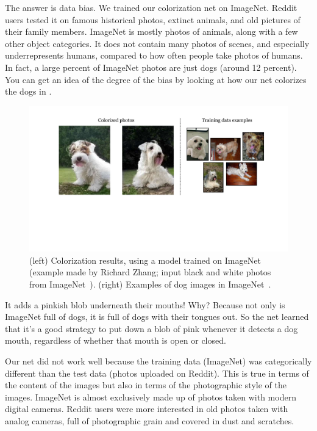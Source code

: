 The answer is data bias. We trained our colorization net on ImageNet. Reddit users tested it on famous historical photos, extinct animals, and old pictures of their family members. ImageNet is mostly photos of animals, along with a few other object categories. It does not contain many photos of scenes, and especially underrepresents humans, compared to how often people take photos of humans. In fact, a large percent of ImageNet photos are just dogs (around 12 percent). You can get an idea of the degree of the bias by looking at how our net colorizes the dogs in \fig{\ref{fig:bias_and_shift:dogs_with_tongues}}.
\begin{figure}[h!]
    \centerline{
    \includegraphics[width=0.9\linewidth]{./figures/bias_and_shift/dogs_with_tongues.pdf}
    }
    \caption{(left) Colorization results, using a model trained on ImageNet (example made by Richard Zhang; input black and white photos from ImageNet~\cite{russakovsky2015imagenet}). (right) Examples of dog images in ImageNet~\cite{russakovsky2015imagenet}. }
    \label{fig:bias_and_shift:dogs_with_tongues}
\end{figure}

It adds a pinkish blob underneath their mouths! Why? Because not only is ImageNet full of dogs, it is full of dogs with their tongues out. So the net learned that it's a good strategy to put down a blob of pink whenever it detects a dog mouth, regardless of whether that mouth is open or closed.

Our net did not work well because the training data (ImageNet) was categorically different than the test data (photos uploaded on Reddit). This is true in terms of the content of the images but also in terms of the photographic style of the images. ImageNet is almost exclusively made up of photos taken with modern digital cameras. Reddit users were more interested in old photos taken with analog cameras, full of photographic grain and covered in dust and scratches.

